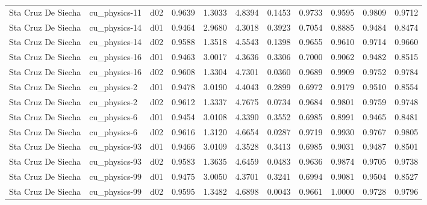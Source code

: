 \begin{longtable}{lllrrrrrrrr}
   Sta Cruz De Siecha  &         cu\_physics-11 &     d02 &   0.9639 &   1.3033 &   4.8394 &       0.1453 &        0.9733 &       0.9595 &           0.9809 &  0.9712 \\
   Sta Cruz De Siecha  &         cu\_physics-14 &     d01 &   0.9464 &   2.9680 &   4.3018 &       0.3923 &        0.7054 &       0.8885 &           0.9484 &  0.8474 \\
   Sta Cruz De Siecha  &         cu\_physics-14 &     d02 &   0.9588 &   1.3518 &   4.5543 &       0.1398 &        0.9655 &       0.9610 &           0.9714 &  0.9660 \\
   Sta Cruz De Siecha  &         cu\_physics-16 &     d01 &   0.9463 &   3.0017 &   4.3636 &       0.3306 &        0.7000 &       0.9062 &           0.9482 &  0.8515 \\
   Sta Cruz De Siecha  &         cu\_physics-16 &     d02 &   0.9608 &   1.3304 &   4.7301 &       0.0360 &        0.9689 &       0.9909 &           0.9752 &  0.9784 \\
   Sta Cruz De Siecha  &          cu\_physics-2 &     d01 &   0.9478 &   3.0190 &   4.4043 &       0.2899 &        0.6972 &       0.9179 &           0.9510 &  0.8554 \\
   Sta Cruz De Siecha  &          cu\_physics-2 &     d02 &   0.9612 &   1.3337 &   4.7675 &       0.0734 &        0.9684 &       0.9801 &           0.9759 &  0.9748 \\
   Sta Cruz De Siecha  &          cu\_physics-6 &     d01 &   0.9454 &   3.0108 &   4.3390 &       0.3552 &        0.6985 &       0.8991 &           0.9465 &  0.8481 \\
   Sta Cruz De Siecha  &          cu\_physics-6 &     d02 &   0.9616 &   1.3120 &   4.6654 &       0.0287 &        0.9719 &       0.9930 &           0.9767 &  0.9805 \\
   Sta Cruz De Siecha  &         cu\_physics-93 &     d01 &   0.9466 &   3.0109 &   4.3528 &       0.3413 &        0.6985 &       0.9031 &           0.9487 &  0.8501 \\
   Sta Cruz De Siecha  &         cu\_physics-93 &     d02 &   0.9583 &   1.3635 &   4.6459 &       0.0483 &        0.9636 &       0.9874 &           0.9705 &  0.9738 \\
   Sta Cruz De Siecha  &         cu\_physics-99 &     d01 &   0.9475 &   3.0050 &   4.3701 &       0.3241 &        0.6994 &       0.9081 &           0.9504 &  0.8527 \\
   Sta Cruz De Siecha  &         cu\_physics-99 &     d02 &   0.9595 &   1.3482 &   4.6898 &       0.0043 &        0.9661 &       1.0000 &           0.9728 &  0.9796 \\

\end{longtable}
